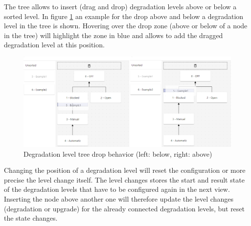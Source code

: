 The tree allows to insert (drag and drop) degradation levels above or below a sorted level. In figure \ref{fig:degradation_level_tree_drop} an example for the drop above and below a degradation level in the tree is shown. Hovering over the drop zone (above or below of a node in the tree) will highlight the zone in blue and allows to add the dragged degradation level at this position. 

\begin{figure}[ht]
    \centering
    \includegraphics[width=\textwidth]{img/degradation_tree_drop.png}
    \caption{Degradation level tree drop behavior (left: below, right: above)}
    \label{fig:degradation_level_tree_drop}
\end{figure}

Changing the position of a degradation level will reset the configuration or more precise the level change itself. The level changes stores the start and result state of the degradation levels that have to be configured again in the next view. Inserting the node above another one will therefore update the level changes (degradation or upgrade) for the already connected degradation levels, but reset the state changes.

